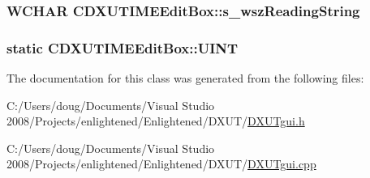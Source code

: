 \label{class_c_d_x_u_t_i_m_e_edit_box_aad444411a488a4cffc4e221338948a86}
\hypertarget{class_c_d_x_u_t_i_m_e_edit_box_a858d222d1a4282ce8154bb3867018e1f}{
\subsubsection[{s\_\-wszReadingString}]{\setlength{\rightskip}{0pt plus 5cm}WCHAR {\bf CDXUTIMEEditBox::s\_\-wszReadingString}}}
\label{class_c_d_x_u_t_i_m_e_edit_box_a858d222d1a4282ce8154bb3867018e1f}
\hypertarget{class_c_d_x_u_t_i_m_e_edit_box_a7c83b549328a07897bdac88bb0ac4d68}{
\subsubsection[{UINT}]{\setlength{\rightskip}{0pt plus 5cm}static {\bf CDXUTIMEEditBox::UINT}}}
\label{class_c_d_x_u_t_i_m_e_edit_box_a7c83b549328a07897bdac88bb0ac4d68}


The documentation for this class was generated from the following files:\begin{DoxyCompactItemize}
\item 
C:/Users/doug/Documents/Visual Studio 2008/Projects/enlightened/Enlightened/DXUT/\hyperlink{_d_x_u_tgui_8h}{DXUTgui.h}\item 
C:/Users/doug/Documents/Visual Studio 2008/Projects/enlightened/Enlightened/DXUT/\hyperlink{_d_x_u_tgui_8cpp}{DXUTgui.cpp}\end{DoxyCompactItemize}

